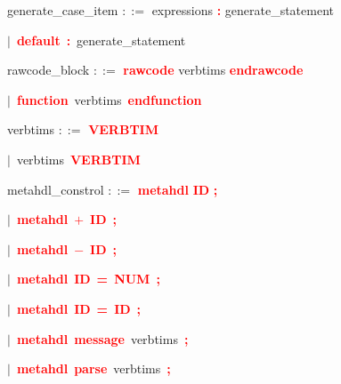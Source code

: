 \vspace{1em}
\noindent
\settowidth{\parindent}{\hspace{4ex}}
generate\_case\_item $::=$\hspace{1ex} expressions \textbf{\textcolor{red}{:}} generate\_statement

\mbox{$|$ \textbf{\textcolor{red}{default}} \textbf{\textcolor{red}{:}} generate\_statement}

\vspace{1em}
\noindent
\settowidth{\parindent}{\hspace{4ex}}
rawcode\_block $::=$\hspace{1ex} \textbf{\textcolor{red}{rawcode}} verbtims \textbf{\textcolor{red}{endrawcode}}

\mbox{$|$ \textbf{\textcolor{red}{function}} verbtims \textbf{\textcolor{red}{endfunction}}}

\vspace{1em}
\noindent
\settowidth{\parindent}{\hspace{4ex}}
verbtims $::=$\hspace{1ex} \textbf{\textcolor{red}{VERBTIM}}

\mbox{$|$ verbtims \textbf{\textcolor{red}{VERBTIM}}}

\vspace{1em}
\noindent
\settowidth{\parindent}{\hspace{4ex}}
metahdl\_constrol $::=$\hspace{1ex} \textbf{\textcolor{red}{metahdl}} \textbf{\textcolor{red}{ID}} \textbf{\textcolor{red}{;}}

\mbox{$|$ \textbf{\textcolor{red}{metahdl}} \textbf{\textcolor{red}{$+$}} \textbf{\textcolor{red}{ID}} \textbf{\textcolor{red}{;}}}

\mbox{$|$ \textbf{\textcolor{red}{metahdl}} \textbf{\textcolor{red}{$-$}} \textbf{\textcolor{red}{ID}} \textbf{\textcolor{red}{;}}}

\mbox{$|$ \textbf{\textcolor{red}{metahdl}} \textbf{\textcolor{red}{ID}} \textbf{\textcolor{red}{=}} \textbf{\textcolor{red}{NUM}} \textbf{\textcolor{red}{;}}}

\mbox{$|$ \textbf{\textcolor{red}{metahdl}} \textbf{\textcolor{red}{ID}} \textbf{\textcolor{red}{=}} \textbf{\textcolor{red}{ID}} \textbf{\textcolor{red}{;}}}

\mbox{$|$ \textbf{\textcolor{red}{metahdl}} \textbf{\textcolor{red}{message}} verbtims \textbf{\textcolor{red}{;}}}

\mbox{$|$ \textbf{\textcolor{red}{metahdl}} \textbf{\textcolor{red}{parse}} verbtims \textbf{\textcolor{red}{;}}}
